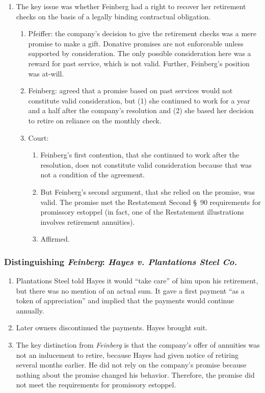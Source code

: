 \begin{enumerate}
    \item The key issue was whether Feinberg had a right to recover her 
    retirement checks on the basis of a legally binding contractual 
    obligation.
    \begin{enumerate}
        \item Pfeiffer: the company's decision to give the retirement checks 
        was a mere promise to make a gift. Donative promises are not 
        enforceable unless supported by consideration. The only possible 
        consideration here was a reward for past service, which is not valid. 
        Further, Feinberg's position was at-will.
        \item Feinberg: agreed that a promise based on past services would not 
        constitute valid consideration, but (1) she continued to work for a 
        year and a half after the company's resolution and (2) she based her 
        decision to retire on reliance on the monthly check.
        \item Court: 
        \begin{enumerate}
            \item Feinberg's first contention, that she continued to work 
            after the resolution, does not constitute valid consideration 
            because that was not a condition of the agreement.
            \item But Feinberg's second argument, that she relied on the 
            promise, was valid. The promise met the Restatement Second \S\ 90 
            requirements for promissory estoppel (in fact, one of the 
            Restatement illustrations involves retirement annuities).
            \item Affirmed.
        \end{enumerate}
    \end{enumerate}
\end{enumerate}

\subsubsection{Distinguishing \emph{Feinberg}: \emph{Hayes v. Plantations 
Steel Co.}}

\begin{enumerate}
    \item Plantations Steel told Hayes it would ``take care'' of him upon his 
    retirement, but there was no mention of an actual sum. It gave a first 
    payment ``as a token of appreciation'' and implied that the payments would 
    continue annually.
    \item Later owners discontinued the payments. Hayes brought suit.
    \item The key distinction from \emph{Feinberg} is that the company's offer 
    of annuities was not an inducement to retire, because Hayes had given 
    notice of retiring several months earlier. He did not rely on the 
    company's promise because nothing about the promise changed his behavior. 
    Therefore, the promise did not meet the requirements for promissory 
    estoppel.
\end{enumerate}

